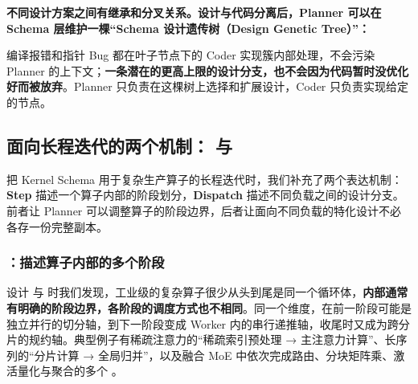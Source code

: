 
\textbf{不同设计方案之间有继承和分叉关系。设计与代码分离后，Planner 可以在 Schema 层维护一棵“Schema 设计遗传树（Design Genetic Tree）”：}


\begin{DiagramBlock}
\end{DiagramBlock}
编译报错和指针 Bug 都在叶子节点下的 Coder 实现簇内部处理，不会污染 Planner 的上下文；\textbf{一条潜在的更高上限的设计分支，也不会因为代码暂时没优化好而被放弃}。Planner 只负责在这棵树上选择和扩展设计，Coder 只负责实现给定的节点。


\newpage

\subsection{面向长程迭代的两个机制： 与 }\label{sec:step-dispatch}
把 Kernel Schema 用于复杂生产算子的长程迭代时，我们补充了两个表达机制：\textbf{Step} 描述一个算子内部的阶段划分，\textbf{Dispatch} 描述不同负载之间的设计分支。前者让 Planner 可以调整算子的阶段边界，后者让面向不同负载的特化设计不必各存一份完整副本。


\subsubsection{：描述算子内部的多个阶段}\label{sec:step}
设计  与  时我们发现，工业级的复杂算子很少从头到尾是同一个循环体，\textbf{内部通常有明确的阶段边界，各阶段的调度方式也不相同}。同一个维度，在前一阶段可能是独立并行的切分轴，到下一阶段变成 Worker 内的串行递推轴，收尾时又成为跨分片的规约轴。典型例子有稀疏注意力的“稀疏索引预处理 → 主注意力计算”、长序列的“分片计算 → 全局归并”，以及融合 MoE 中依次完成路由、分块矩阵乘、激活量化与聚合的多个 。


